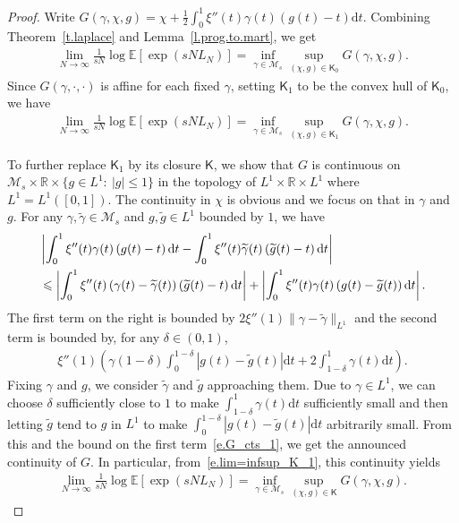\documentclass[11pt]{amsart}
\theoremstyle{remark}
\theoremstyle{definition}
\numberwithin{equation}{section}
\numberwithin{proposition}{section}
\numberwithin{figure}{section}
\numberwithin{table}{section}
\newcommand{\R}{\mathbb{R}}
\newcommand{\E}{\mathbb{E}}
\renewcommand{\leq}{\leqslant}
\renewcommand{\tilde}{\widetilde}
\newcommand{\Ll}{\left}
\newcommand{\Rr}{\right}
\renewcommand{\d}{\mathrm{d}}
\newcommand{\1}{\mathbf{1}}
\newcommand{\mcl}{\mathcal}
\newcommand{\msf}{\mathsf}
\newcommand{\cM}{\mathcal{M}}
\begin{document}
\begin{proof}
Write $G(\gamma,\chi,g) = \chi+\frac{1}{2}\int_0^1 \xi''(t)\gamma(t)\Ll(g(t) -t \Rr)\d t$.
Combining Theorem~\ref{t.laplace} and Lemma~\ref{l.prog.to.mart}, we get
\begin{align*}
    \lim_{N\to \infty} \frac{1}{sN} \log \E \Ll[ \exp(sN L_N) \Rr] = \inf_{\gamma\in\mcl M_s}\sup_{(\chi,g)\in\msf K_0} G(\gamma,\chi,g).
\end{align*}
Since $G(\gamma,\cdot,\cdot)$ is affine for each fixed $\gamma$, setting $\msf K_1$ to be the convex hull of $\msf K_0$, we have
\begin{align}\label{e.lim=infsup_K_1}
    \lim_{N\to \infty} \frac{1}{sN} \log \E \Ll[ \exp(sN L_N) \Rr] = \inf_{\gamma\in\mcl M_s}\sup_{(\chi,g)\in\msf K_1} G(\gamma,\chi,g).
\end{align}

To further replace $\msf K_1$ by its closure $\msf K$, we show that $G$ is continuous on $\cM_s \times \R \times \{g\in L^1:\:|g|\leq 1\}$ in the topology of $L^1\times\R\times L^1$ where $L^1 =L^1([0,1])$. The continuity in $\chi$ is obvious and we focus on that in $\gamma$ and $g$. For any $\gamma,\tilde \gamma \in\cM_s$ and $g,\tilde g\in L^1$ bounded by $1$, we have
\begin{align}
    &\Ll|\int_0^1 \xi''(t)\gamma(t)\Ll(g(t) -t \Rr)\d t - \int_0^1 \xi''(t)\tilde\gamma(t)\Ll(\tilde g(t) -t \Rr)\d t\Rr| \notag
    \\
    &\leq \Ll|\int_0^1 \xi''(t)\Ll(\gamma(t)-\tilde \gamma(t)\Rr)\Ll(\tilde g(t) -t\Rr)\d t\Rr| +\Ll| \int_0^1 \xi''(t)\gamma(t)\Ll(g(t) -\tilde g(t) \Rr)\d t\Rr| . \label{e.G_cts_1}
\end{align}
The first term on the right is bounded by $2\xi''(1)\|\gamma-\tilde \gamma\|_{L^1}$ and the second term is bounded by, for any $\delta\in(0,1)$, 
\begin{align}\label{e.G_cts_2}
    \xi''(1)\Ll(\gamma(1-\delta)\int_0^{1-\delta}\Ll|g(t)-\tilde g(t)\Rr|\d t + 2\int_{1-\delta}^1 \gamma(t)\d t\Rr).
\end{align}
Fixing $\gamma$ and $g$, we consider $\tilde\gamma$ and $\tilde g$ approaching them. Due to $\gamma\in L^1$, we can choose $\delta$ sufficiently close to $1$ to make $\int_{1-\delta}^1 \gamma(t)\d t$ sufficiently small and then letting $\tilde g$ tend to $g$ in $L^1$ to make $\int_0^{1-\delta}\Ll|g(t)-\tilde g(t)\Rr|\d t$ arbitrarily small. From this and the bound on the first term~\eqref{e.G_cts_1}, we get the announced continuity of $G$.
In particular, from~\eqref{e.lim=infsup_K_1}, this continuity yields
\begin{align}\label{e.lim=infsup_K}
    \lim_{N\to \infty} \frac{1}{sN} \log \E \Ll[ \exp(sN L_N) \Rr] = \inf_{\gamma\in\mcl M_s}\sup_{(\chi,g)\in\msf K} G(\gamma,\chi,g).
\end{align}


\end{proof}
\end{document}
